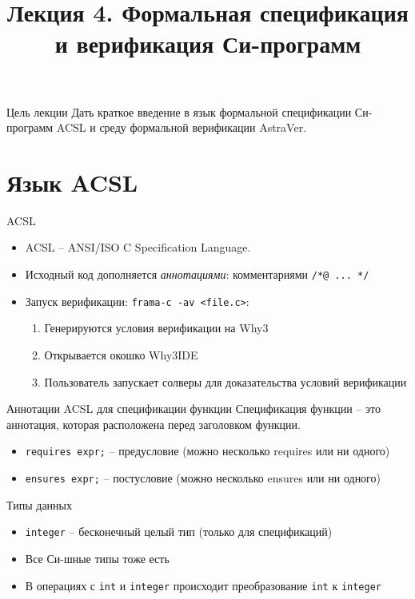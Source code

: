 \documentclass[hyperref={unicode=true}]{beamer}
\title{Лекция 4. Формальная спецификация и верификация Си-программ}
\author{}
\date{}
\begin{document}
	\begin{frame}{}
		\titlepage
	\end{frame}

    \begin{frame}{Цель лекции}
    Дать краткое введение в язык формальной спецификации
    Си-программ ACSL и среду формальной верификации AstraVer.
    \end{frame}


    \section{Язык ACSL}


    \begin{frame}[fragile]{ACSL}
    \begin{itemize}
    \item
    ACSL -- ANSI/ISO C Specification Language.
    \item
    Исходный код дополняется \emph{аннотациями}:
    комментариями \verb|/*@ ... */|
    \item
    Запуск верификации: \verb|frama-c -av <file.c>|:
        \begin{enumerate}
        \item
        Генерируются условия верификации на Why3
        \item
        Открывается окошко Why3IDE
        \item
        Пользователь запускает солверы для доказательства условий верификации
        \end{enumerate}
    \end{itemize}
    \end{frame}


    \begin{frame}[fragile]{Аннотации ACSL для спецификации функции}
    Спецификация функции -- это аннотация, которая
    расположена перед заголовком функции.
    \begin{itemize}
    \item
    \verb|requires expr;| -- предусловие
    (можно несколько requires или ни одного)
    \item
    \verb|ensures expr;| -- постусловие
    (можно несколько ensures или ни одного)
    \end{itemize}
    \end{frame}

    \begin{frame}[fragile]{Типы данных}
    \begin{itemize}
    \item
    \verb|integer| -- бесконечный целый тип (только для спецификаций)
    \item
    Все Си-шные типы тоже есть
    \item
    В операциях с \verb|int| и \verb|integer| происходит преобразование
    \verb|int| к \verb|integer|
    \end{itemize}
    \end{frame}
\end{document}

